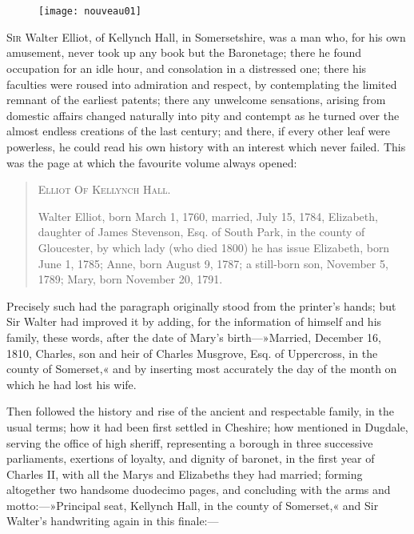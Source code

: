 \chapter[Chapter \thechapter]{}

\begin{figure}[t!]
\centering
\texttt{[image: nouveau01]}
\end{figure}

\lettrine[lines=4,lraise=0.3]{S}{ir} Walter Elliot, of Kellynch Hall, in Somersetshire, was a man who, for his own amusement, never took up any book but the Baronetage; there he found occupation for an idle hour, and consolation in a distressed one; there his faculties were roused into admiration and respect, by contemplating the limited remnant of the earliest patents; there any unwelcome sensations, arising from domestic affairs changed naturally into pity and contempt as he turned over the almost endless creations of the last century; and there, if every other leaf were powerless, he could read his own history with an interest which never failed. This was the page at which the favourite volume always opened:

\begin{quote}
	\begin{center}\scshape
Elliot Of Kellynch Hall.
\end{center}

Walter Elliot, born March 1, 1760, married, July 15, 1784, Elizabeth, daughter of James Stevenson, Esq. of South Park, in the county of Gloucester, by which lady (who died 1800) he has issue Elizabeth, born June 1, 1785; Anne, born August 9, 1787; a still-born son, November 5, 1789; Mary, born November 20, 1791.
\end{quote}

Precisely such had the paragraph originally stood from the printer's hands; but Sir Walter had improved it by adding, for the information of himself and his family, these words, after the date of Mary's birth—»Married, December 16, 1810, Charles, son and heir of Charles Musgrove, Esq. of Uppercross, in the county of Somerset,« and by inserting most accurately the day of the month on which he had lost his wife.

Then followed the history and rise of the ancient and respectable family, in the usual terms; how it had been first settled in Cheshire; how mentioned in Dugdale, serving the office of high sheriff, representing a borough in three successive parliaments, exertions of loyalty, and dignity of baronet, in the first year of Charles II, with all the Marys and Elizabeths they had married; forming altogether two handsome duodecimo pages, and concluding with the arms and motto:—»Principal seat, Kellynch Hall, in the county of Somerset,« and Sir Walter's handwriting again in this finale:—

